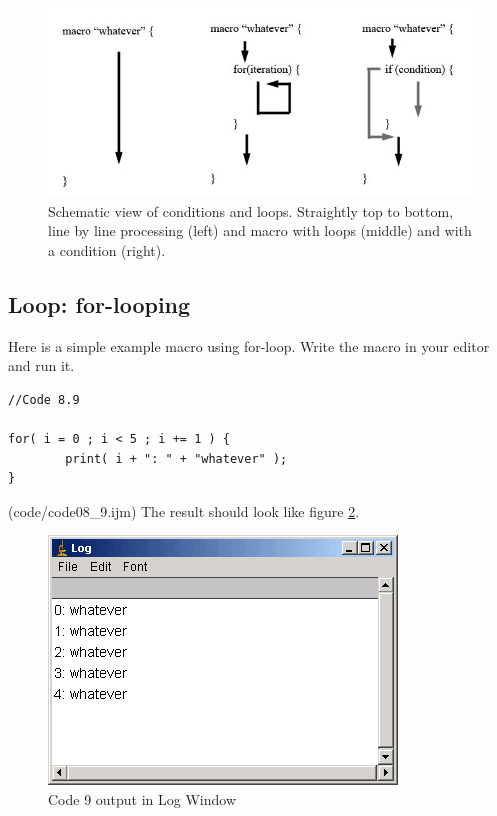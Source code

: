 \documentclass[11pt,a4paper,oneside]{report}
\begin{document}
\begin{figure}[htbp]
\begin{center}
\includegraphics[width=\textwidth]{fig/fig23_1_ScriptSchemes.png}
\caption{Schematic view of conditions and loops. Straightly top to bottom, line by line processing (left) and macro with loops (middle) and with a condition (right).} \label{fig_scriptscheme}
\end{center}
\end{figure}

\subsection{Loop: for-looping}
Here is a simple example macro using for-loop. Write the macro in your editor and run it. 

\begin{lstlisting}[morekeywords={*, for}]
//Code 8.9

for( i = 0 ; i < 5 ; i += 1 ) {
		print( i + ": " + "whatever" );
}

\end{lstlisting}
(code/code08_9.ijm)
The result should look like figure \ref{fig_whateverOut}.

\begin{figure}[!ht]
\begin{center}
\includegraphics[scale=0.6]{fig/fig2311_whatever5.png}
\caption{Code 9 output in Log Window}
\label{fig_whateverOut}
\end{center}
\end{figure}
\end{document}
